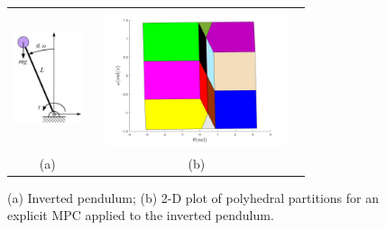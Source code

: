 \begin{figure}[t]
	\begin{tabular}{cc}
	\includegraphics[width=2cm,height=4cm]{Figs/inv_pend.png}&	\includegraphics[width=6cm,height=4cm]{Figs/regs.jpg}\\
	(a)&(b)
	\end{tabular}
	\caption{(a) Inverted pendulum; (b) 2-D plot of polyhedral partitions for an explicit MPC applied to the inverted pendulum.}
	\label{fig:inverted_pendulum}
\end{figure}

